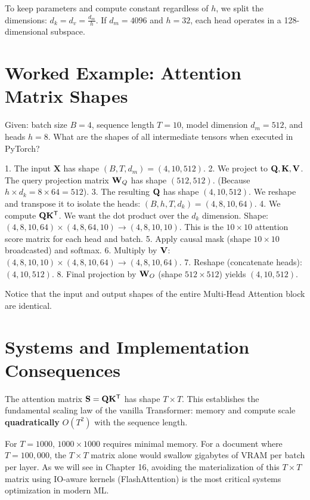 To keep parameters and compute constant regardless of $h$, we split the dimensions: $d_k = d_v = \frac{d_m}{h}$. If $d_m = 4096$ and $h = 32$, each head operates in a 128-dimensional subspace.

\section{Worked Example: Attention Matrix Shapes}
\label{ch:09:sec:example}

Given: batch size $B=4$, sequence length $T=10$, model dimension $d_m = 512$, and heads $h=8$.
What are the shapes of all intermediate tensors when executed in PyTorch?

1. The input $\mathbf{X}$ has shape $(B, T, d_m) = (4, 10, 512)$.
2. We project to $\mathbf{Q}, \mathbf{K}, \mathbf{V}$. The query projection matrix $\mathbf{W}_Q$ has shape $(512, 512)$. (Because $h \times d_k = 8 \times 64 = 512$).
3. The resulting $\mathbf{Q}$ has shape $(4, 10, 512)$. We reshape and transpose it to isolate the heads: $(B, h, T, d_k) = (4, 8, 10, 64)$.
4. We compute $\mathbf{Q} \mathbf{K}^{\mathsf{T}}$. We want the dot product over the $d_k$ dimension.
   Shape: $(4, 8, 10, 64) \times (4, 8, 64, 10) \rightarrow (4, 8, 10, 10)$. 
   This is the $10 \times 10$ attention score matrix for each head and batch.
5. Apply causal mask (shape $10 \times 10$ broadcasted) and softmax.
6. Multiply by $\mathbf{V}$: $(4, 8, 10, 10) \times (4, 8, 10, 64) \rightarrow (4, 8, 10, 64)$.
7. Reshape (concatenate heads): $(4, 10, 512)$.
8. Final projection by $\mathbf{W}_O$ (shape $512 \times 512$) yields $(4, 10, 512)$.

Notice that the input and output shapes of the entire Multi-Head Attention block are identical.

\section{Systems and Implementation Consequences}
\label{ch:09:sec:systems}

The attention matrix $\mathbf{S} = \mathbf{Q} \mathbf{K}^{\mathsf{T}}$ has shape $T \times T$. This establishes the fundamental scaling law of the vanilla Transformer: memory and compute scale \textbf{quadratically} $O(T^2)$ with the sequence length. 

For $T=1000$, $1000 \times 1000$ requires minimal memory. For a document where $T=100,000$, the $T \times T$ matrix alone would swallow gigabytes of VRAM per batch per layer. As we will see in Chapter 16, avoiding the materialization of this $T \times T$ matrix using IO-aware kernels (FlashAttention) is the most critical systems optimization in modern ML.

